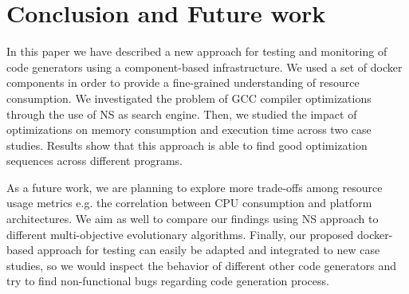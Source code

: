 \section{Conclusion and Future work}

In this paper we have described a new approach for testing and monitoring of code generators using a component-based infrastructure. We used a set of docker components in order to provide a fine-grained understanding of resource consumption. We investigated the problem of GCC compiler optimizations through the use of NS as search engine. Then, we studied the impact of optimizations on memory consumption and execution time across two case studies. Results show that this approach is able to find good optimization sequences across different programs.

As a future work, we are planning to explore more trade-offs among resource usage metrics e.g. the correlation between CPU consumption and platform architectures. We aim as well to compare our findings using NS approach to different multi-objective evolutionary algorithms. Finally, our proposed docker-based approach for testing can easily be adapted and integrated to new case studies, so we would inspect the behavior of different other code generators and try to find non-functional bugs regarding code generation process.

